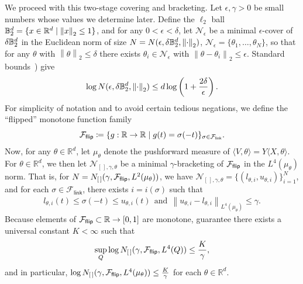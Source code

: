 \documentclass[11pt]{article}
\newcommand{\R}{\mathbb{R}} %
\newcommand{\mc}[1]{\mathcal{#1}}
\newcommand{\prn}[1]{\left({#1}\right)} %
\newcommand{\norm}[1]{\left\|{#1}\right\|} %
\newcommand{\Flink}{\mathcal{F}_{\mathsf{link}}}
\newcommand{\ltwo}[1]{\norm{#1}_2} %
\newcommand{\<}{\langle} %
\renewcommand{\>}{\rangle}
\newcommand{\defeq}{\coloneqq}
\begin{document}
We proceed with this two-stage covering and bracketing.
Let $\epsilon, \gamma > 0$ be small numbers whose values we determine
later.
Define the $\ell_2$ ball $\ball_2^d = \{x \in \R^d \mid  \ltwo{x} \le 1\}$,
and for any $0 < \epsilon < \delta$, let
$\mc{N}_\epsilon$ be a minimal $\epsilon$-cover of $\delta \mathbb{B}_2^d$
in the Euclidean norm
of size $N = N(\epsilon, \delta \ball_2^d, \ltwo{\cdot})$,
$\mc{N}_\epsilon = \{\theta_1, \ldots, \theta_N\}$, so that for
any $\theta$ with $\ltwo{\theta} \le \delta$ there exists
$\theta_i \in \mc{N}_\epsilon$ with $\ltwo{\theta - \theta_i} \le \epsilon$.
Standard bounds~\cite[Lemma~5.7]{Wainwright19}) give
\begin{align}
	\label{eqn:ball-covering-number}
	\log N(\epsilon, \delta \ball_2^d, \ltwo{\cdot})
	\le d \log \prn{1 + \frac{2\delta}{\epsilon}}.
\end{align}
For simplicity of notation and to avoid certain tedious negations, we define
the ``flipped'' monotone function family
\begin{equation*}
	\Fflip \defeq \{g : \R \to \R \mid g(t) = \sigma(-t)\}_{
		\sigma \in \Flink}.
\end{equation*}
Now, for any $\theta \in \R^d$, let
$\mu_\theta$
denote the pushforward measure of $\<V, \theta\> = Y\<X, \theta\>$.
For $\theta \in \R^d$, we then let
$\mathcal{N}_{[\,],\gamma, \theta}$ be a minimal
$\gamma$-bracketing of
$\Fflip$
in the  $L^4(\mu_{\theta})$ norm. That is,
for $N = N_{[\,]}(\gamma, \Fflip, L^2(\mu_\theta))$, we have
$\mathcal{N}_{[\,], \gamma, \theta}
= \{(l_{\theta, i}, u_{\theta, i})\}_{i = 1}^{N}$,
and for each $\sigma \in \Flink$,
there exists $i = i(\sigma)$ such that
\begin{align*}
	l_{\theta, i}(t) \leq
	\sigma(-t) \leq
	u_{\theta, i}(t)
	~~ \mbox{and} ~~ \norm{u_{\theta, i} - l_{\theta, i}}_{L^4(\mu_{\theta})}
	\leq \gamma.
\end{align*}
Because elements of $\Fflip \subset \R \to [0, 1]$ are monotone,
\citet[Thm.~2.7.5]{VanDerVaartWe96} guarantee there
exists a universal constant $K < \infty$ such that
\begin{align}
	\label{eqn:monotone-covering-bound}
	\sup_Q \log N_{[\,]}(\gamma, \Fflip, L^4(Q)) \leq \frac{K}{\gamma},
\end{align}
and in particular,
$\log N_{[\,]}(\gamma, \Fflip, L^4(\mu_\theta)) \le \frac{K}{\gamma}$ for
each $\theta \in \R^d$.
\end{document}

